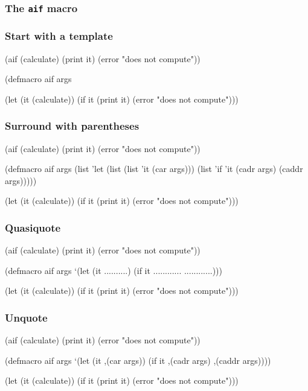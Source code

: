 \documentclass[hyperref={bookmarks=false}]{beamer}
\begin{document}
\begin{frame}[fragile]
\frametitle<1>{The \texttt{aif} macro}
\frametitle<2>{Start with a template}
\begin{semiverbatim}
(aif (calculate)
  (print it)
  (error "does not compute"))

(defmacro aif args

(let (it (calculate))
  (if it
    (print it)
    (error "does not compute")))
\end{semiverbatim}
\end{frame}

\begin{frame}[fragile]
\frametitle{Surround with parentheses}
\begin{semiverbatim}
(aif (calculate)
  (print it)
  (error "does not compute"))

(defmacro aif args
  \alert{(list '}let \alert{(list (list '}it  (car args))\alert{)}
    \alert{(list '}if \alert{'}it
             (cadr args)
             (caddr args))))\alert{)}

(let (it (calculate))
  (if it
    (print it)
    (error "does not compute")))
\end{semiverbatim}
\end{frame}

\begin{frame}[fragile]
\frametitle{Quasiquote}
\begin{semiverbatim}
(aif (calculate)
  (print it)
  (error "does not compute"))

(defmacro aif args
  \alert{     `}(let             (it  ..........)
          (if  it
             ............
             ............)))

(let (it (calculate))
  (if it
    (print it)
    (error "does not compute")))
\end{semiverbatim}
\end{frame}

\begin{frame}[fragile]
\frametitle{Unquote}
\begin{semiverbatim}
(aif (calculate)
  (print it)
  (error "does not compute"))

(defmacro aif args
  \alert{     `}(let             (it \alert{,(car args)})
          (if  it
            \alert{,(cadr args)}
            \alert{,(caddr args)})))

(let (it (calculate))
  (if it
    (print it)
    (error "does not compute")))
\end{semiverbatim}
\end{frame}
\end{document}
